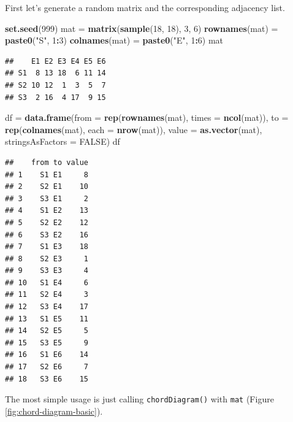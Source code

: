\documentclass[]{book}
\newenvironment{Shaded}{\begin{snugshade}}{\end{snugshade}}
\newcommand{\KeywordTok}[1]{\textcolor[rgb]{0.13,0.29,0.53}{\textbf{#1}}}
\newcommand{\DataTypeTok}[1]{\textcolor[rgb]{0.13,0.29,0.53}{#1}}
\newcommand{\DecValTok}[1]{\textcolor[rgb]{0.00,0.00,0.81}{#1}}
\newcommand{\StringTok}[1]{\textcolor[rgb]{0.31,0.60,0.02}{#1}}
\newcommand{\OtherTok}[1]{\textcolor[rgb]{0.56,0.35,0.01}{#1}}
\newcommand{\OperatorTok}[1]{\textcolor[rgb]{0.81,0.36,0.00}{\textbf{#1}}}
\newcommand{\NormalTok}[1]{#1}
\begin{document}
First let's generate a random matrix and the corresponding adjacency
list.

\begin{Shaded}
\begin{Highlighting}[]
\KeywordTok{set.seed}\NormalTok{(}\DecValTok{999}\NormalTok{)}
\NormalTok{mat =}\StringTok{ }\KeywordTok{matrix}\NormalTok{(}\KeywordTok{sample}\NormalTok{(}\DecValTok{18}\NormalTok{, }\DecValTok{18}\NormalTok{), }\DecValTok{3}\NormalTok{, }\DecValTok{6}\NormalTok{) }
\KeywordTok{rownames}\NormalTok{(mat) =}\StringTok{ }\KeywordTok{paste0}\NormalTok{(}\StringTok{"S"}\NormalTok{, }\DecValTok{1}\OperatorTok{:}\DecValTok{3}\NormalTok{)}
\KeywordTok{colnames}\NormalTok{(mat) =}\StringTok{ }\KeywordTok{paste0}\NormalTok{(}\StringTok{"E"}\NormalTok{, }\DecValTok{1}\OperatorTok{:}\DecValTok{6}\NormalTok{)}
\NormalTok{mat}
\end{Highlighting}
\end{Shaded}

\begin{verbatim}
##    E1 E2 E3 E4 E5 E6
## S1  8 13 18  6 11 14
## S2 10 12  1  3  5  7
## S3  2 16  4 17  9 15
\end{verbatim}

\begin{Shaded}
\begin{Highlighting}[]
\NormalTok{df =}\StringTok{ }\KeywordTok{data.frame}\NormalTok{(}\DataTypeTok{from =} \KeywordTok{rep}\NormalTok{(}\KeywordTok{rownames}\NormalTok{(mat), }\DataTypeTok{times =} \KeywordTok{ncol}\NormalTok{(mat)),}
    \DataTypeTok{to =} \KeywordTok{rep}\NormalTok{(}\KeywordTok{colnames}\NormalTok{(mat), }\DataTypeTok{each =} \KeywordTok{nrow}\NormalTok{(mat)),}
    \DataTypeTok{value =} \KeywordTok{as.vector}\NormalTok{(mat),}
    \DataTypeTok{stringsAsFactors =} \OtherTok{FALSE}\NormalTok{)}
\NormalTok{df}
\end{Highlighting}
\end{Shaded}

\begin{verbatim}
##    from to value
## 1    S1 E1     8
## 2    S2 E1    10
## 3    S3 E1     2
## 4    S1 E2    13
## 5    S2 E2    12
## 6    S3 E2    16
## 7    S1 E3    18
## 8    S2 E3     1
## 9    S3 E3     4
## 10   S1 E4     6
## 11   S2 E4     3
## 12   S3 E4    17
## 13   S1 E5    11
## 14   S2 E5     5
## 15   S3 E5     9
## 16   S1 E6    14
## 17   S2 E6     7
## 18   S3 E6    15
\end{verbatim}

The most simple usage is just calling \texttt{chordDiagram()} with
\texttt{mat} (Figure \ref{fig:chord-diagram-basic}).
\end{document}
